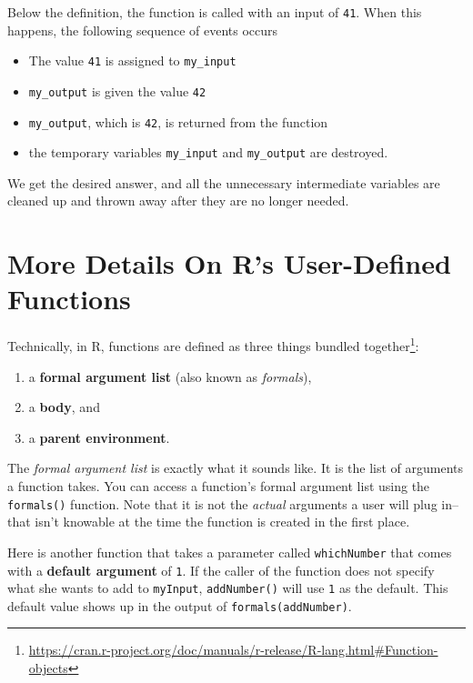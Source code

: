 \documentclass[
  12pt,
  krantz2]{krantz}
\providecommand{\tightlist}{%
  \setlength{\itemsep}{0pt}\setlength{\parskip}{0pt}}
\renewcommand{\href}[2]{#2\footnote{\url{#1}}}
\begin{document}
Below the definition, the function is called with an input of \texttt{41}. When this happens, the following sequence of events occurs

\begin{itemize}
\tightlist
\item
  The value \texttt{41} is assigned to \texttt{my\_input}
\item
  \texttt{my\_output} is given the value \texttt{42}
\item
  \texttt{my\_output}, which is \texttt{42}, is returned from the function
\item
  the temporary variables \texttt{my\_input} and \texttt{my\_output} are destroyed.
\end{itemize}

We get the desired answer, and all the unnecessary intermediate variables are cleaned up and thrown away after they are no longer needed.

\hypertarget{more-details-on-rs-user-defined-functions}{%
\section{More Details On R's User-Defined Functions}\label{more-details-on-rs-user-defined-functions}}

Technically, in R, functions are \href{https://cran.r-project.org/doc/manuals/r-release/R-lang.html\#Function-objects}{defined as three things bundled together}:

\begin{enumerate}
\def\labelenumi{\arabic{enumi}.}
\tightlist
\item
  a \textbf{formal argument list} (also known as \emph{formals}),
\item
  a \textbf{body}, and
\item
  a \textbf{parent environment}.
\end{enumerate}

The \emph{formal argument list} is exactly what it sounds like. It is the list of arguments a function takes. You can access a function's formal argument list using the \texttt{formals()} function. Note that it is not the \emph{actual} arguments a user will plug in--that isn't knowable at the time the function is created in the first place.

Here is another function that takes a parameter called \texttt{whichNumber} that comes with a \textbf{default argument} of \texttt{1}. If the caller of the function does not specify what she wants to add to \texttt{myInput}, \texttt{addNumber()} will use \texttt{1} as the default. This default value shows up in the output of \texttt{formals(addNumber)}.
\end{document}
